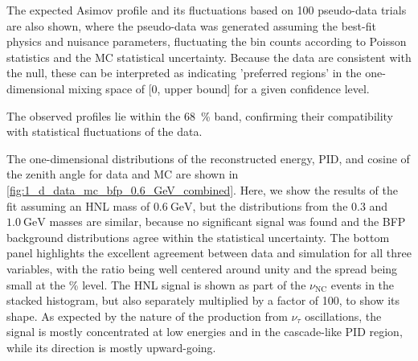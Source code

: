 \documentclass[
    aps,
    prd,
    reprint,
    amsmath,
    amssymb,
    nofootinbib,
    superscriptaddress,
    floatfix
]{revtex4-2}
\begin{document}
The expected Asimov profile and its fluctuations based on 100 pseudo-data trials are also shown, where the pseudo-data was generated assuming the best-fit physics and nuisance parameters, fluctuating the bin counts according to Poisson statistics and the MC statistical uncertainty.
Because the data are consistent with the null, these can be interpreted as indicating 'preferred regions' in the one-dimensional mixing space of [0, upper bound] for a given confidence level.

The observed profiles lie within the \SI{68}{\percent} band, confirming their compatibility with statistical fluctuations of the data.

The one-dimensional distributions of the reconstructed energy, PID, and cosine of the zenith angle for data and MC are shown in \cref{fig:1_d_data_mc_bfp_0.6_GeV_combined}.
Here, we show the results of the fit assuming an HNL mass of $\SI{0.6}\GeV$, but the distributions from the 0.3 and $\SI{1.0}\GeV$ masses are similar, because no significant signal was found and the BFP background distributions agree within the statistical uncertainty.
The bottom panel highlights the excellent agreement between data and simulation for all three variables, with the ratio being well centered around unity and the spread being small at the \si{\percent} level.
The HNL signal is shown as part of the $\nu_\mathrm{NC}$ events in the stacked histogram, but also separately multiplied by a factor of 100, to show its shape.
As expected by the nature of the production from $\nu_\tau$ oscillations, the signal is mostly concentrated at low energies and in the cascade-like PID region, while its direction is mostly upward-going.
\end{document}
